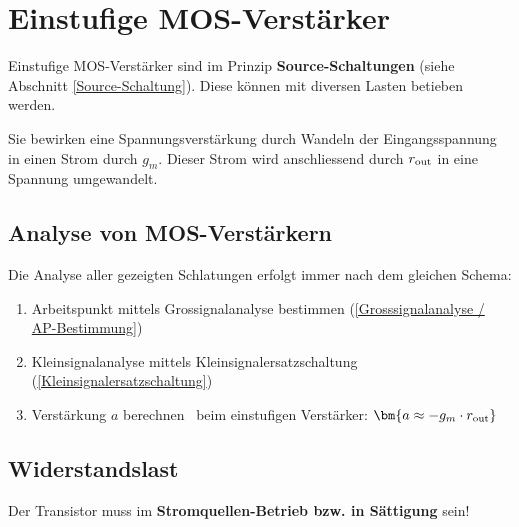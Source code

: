 \section{Einstufige MOS-Verstärker}

Einstufige MOS-Verstärker sind im Prinzip \textbf{Source-Schaltungen} (siehe Abschnitt \ref{Source-Schaltung}).
Diese können mit diversen Lasten betieben werden.

Sie bewirken eine Spannungsverstärkung durch Wandeln der Eingangsspannung in einen Strom durch $g_m$.
Dieser Strom wird anschliessend durch $r_{\rm out}$ in eine Spannung umgewandelt.


\subsection{Analyse von MOS-Verstärkern}

Die Analyse aller gezeigten Schlatungen erfolgt immer nach dem gleichen Schema:

\smallskip

\begin{enumerate}
    \item Arbeitspunkt mittels Grossignalanalyse bestimmen (\ref{Grosssignalanalyse / AP-Bestimmung})
    \item Kleinsignalanalyse mittels Kleinsignalersatzschaltung (\ref{Kleinsignalersatzschaltung})
    \item Verstärkung $a$ berechnen \textrightarrow\ beim einstufigen Verstärker: $\bm{a \approx - g_m \cdot r_{\rm out}}$
\end{enumerate}


\subsection{Widerstandslast}

Der Transistor muss im \textbf{Stromquellen-Betrieb bzw. in Sättigung} sein!

